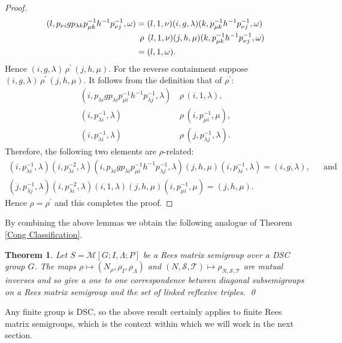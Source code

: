 \documentclass[a4paper, 12pt,reqno]{amsart}
\theoremstyle{plain}
\newtheorem{thm}{Theorem}[section]
\theoremstyle{definition}
\theoremstyle{remark}
\newcommand{\RM}{\mathcal{M}[G;I,\Lambda;P]}
\newcommand{\normspace}[1]{\, #1 \,}
\newcommand{\bigspace}[1]{\hspace{4.5pt} #1 \hspace{4.5pt}}
\begin{document}
\begin{proof}
\begin{align*}
        (l,p_{\nu i} g p_{\lambda k} p_{\mu k}^{-1} h^{-1} p_{\nu j}^{-1} , \omega) & = (l,1,\nu)(i,g,\lambda)(k,p_{\mu k}^{-1} h^{-1} p_{\nu j}^{-1},\omega) \\
        & \bigspace{\rho} (l,1,\nu)(j,h,\mu)(k,p_{\mu k}^{-1} h^{-1} p_{\nu j}^{-1},\omega) \\
        & = (l,1,\omega).
    \end{align*}
    Hence $(i,g,\lambda) \normspace{\rho^\prime} (j,h,\mu)$.
    For the reverse containment suppose $(i,g,\lambda) \normspace{\rho^\prime} (j,h,\mu)$.
    It follows from the definition that of $\rho^\prime$:
    \begin{align*}
        (i,p_{\lambda i} g p_{\lambda i}p_{\mu i}^{-1} h^{-1} p_{\lambda j}^{-1},\lambda) & \normspace{\rho} (i,1,\lambda), \\
        (i,p_{\lambda i}^{-1},\lambda) & \normspace{\rho} (i,p_{\mu i}^{-1},\mu), \\
        (i,p_{\lambda i}^{-1},\lambda) & \normspace{\rho} (j,p_{\lambda j}^{-1},\lambda).
    \end{align*}
    Therefore, the following two elements are $\rho$-related:
    \begin{align*}
        (i,p_{\lambda i}^{-1},\lambda)(i,p_{\lambda i}^{-2},\lambda)(i,p_{\lambda i} g p_{\lambda i} p_{\mu i}^{-1} h^{-1} p_{\lambda j}^{-1},\lambda)(j,h,\mu)(i,p_{\lambda i}^{-1},\lambda) = (i,g,\lambda),&&\text{and}\\
        (j,p_{\lambda j}^{-1},\lambda)(i,p_{\lambda i}^{-2},\lambda)(i,1,\lambda)(j,h,\mu)(i,p_{\mu i}^{-1},\mu) = (j,h,\mu).&&
    \end{align*}
    Hence $\rho = \rho^\prime$ and this completes the proof.
\end{proof}
By combining the above lemmas we obtain the following analogue of Theorem \ref{Cong Classification}.
\begin{thm}
    \label{diag classification}
    Let $S = \RM$ be a Rees matrix semigroup over a DSC group $G$.
    The maps $\rho \mapsto (N_\rho , \rho_I,\rho_\Lambda)$ and $(N,\mathcal{S},\mathcal{T}) \mapsto \rho_{N,\mathcal{S},\mathcal{T}}$ are mutual inverses and so give a one to one correspondence between diagonal subsemigroups on a Rees matrix semigroup and the set of linked reflexive triples. \qed
\end{thm}

Any finite group is DSC, so the above result certainly applies to finite Rees matrix semigroups, which is the context within which we will work in the next section.
\end{document}
